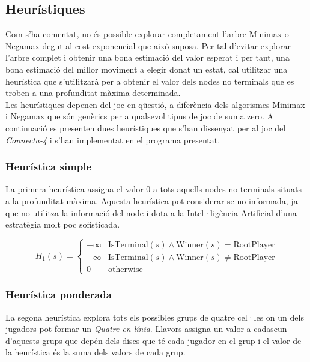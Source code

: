 \documentclass[12pt,a4paper]{article}
\begin{document}
\subsection{Heurístiques}
Com s'ha comentat, no és possible explorar completament l'arbre Minimax o Negamax degut al cost exponencial que això suposa. Per tal d'evitar explorar l'arbre complet i obtenir una bona estimació del valor esperat i per tant, una bona estimació del millor moviment a elegir donat un estat, cal utilitzar una heurística que s'utilitzarà per a obtenir el valor dels nodes no terminals que es troben a una profunditat màxima determinada.\\

Les heurístiques depenen del joc en qüestió, a diferència dels algorismes Minimax i Negamax que són genèrics per a qualsevol tipus de joc de suma zero. A continuació es presenten dues heurístiques que s'han dissenyat per al joc del \emph{Connecta-4} i s'han implementat en el programa presentat.

\subsubsection{Heurística simple}\label{sec:heur_simple}
La primera heurística assigna el valor 0 a tots aquells nodes no terminals situats a la profunditat màxima. Aquesta heurística  pot considerar-se no-informada, ja que no utilitza la informació del node i dota a la Intel·ligència Artificial d'una estratègia molt poc sofisticada.

\begin{equation}
H_1(s) = \begin{cases}
+\infty & \text{IsTerminal}(s) \wedge \text{Winner}(s) = \text{RootPlayer}\\
- \infty & \text{IsTerminal}(s) \wedge \text{Winner}(s) \neq \text{RootPlayer}\\
0 & \text{otherwise}
\end{cases}
\end{equation}

\subsubsection{Heurística ponderada}\label{sec:heur_ponderada}
La segona heurística explora tots els possibles grups de quatre cel·les on un dels jugadors pot formar un \emph{Quatre en línia}. Llavors assigna un valor a cadascun d'aquests grups que depén dels discs que té cada jugador en el grup i el valor de la heurística és la suma dels valors de cada grup.\\
\end{document}
